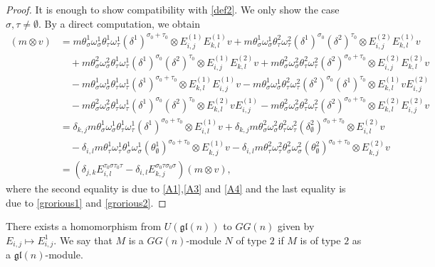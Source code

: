 \documentclass{article}
\theoremstyle{definition}
\theoremstyle{remark}
\numberwithin{equation}{section}
\numberwithin{equation}{section}
\begin{document}
\begin{proof}
It is enough to show compatibility with \eqref{def2}. We only show the case $\sigma,\tau\neq\emptyset$. By a direct computation, we obtain
\begin{align*}
[E_{i,j}^\tau,E_{k,l}^\sigma](m\otimes v)
&=m\theta^1_\sigma\omega^1_\sigma\theta^1_\tau\omega^1_\tau(\delta^1)^{\sigma_0+\tau_0}\otimes E^{(1)}_{i,j}E^{(1)}_{k,l}v+m\theta^1_\sigma\omega^1_\sigma\theta^2_\tau\omega^2_\tau(\delta^1)^{\sigma_0}(\delta^2)^{\tau_0}\otimes E^{(2)}_{i,j}E^{(1)}_{k,l}v\\
&\quad+m\theta^2_\sigma\omega^2_\sigma\theta^1_\tau\omega^1_\tau(\delta^1)^{\sigma_0}(\delta^2)^{\tau_0}\otimes E^{(1)}_{i,j}E^{(2)}_{k,l}v+m\theta^2_\sigma\omega^2_\sigma\theta^2_\tau\omega^2_\tau(\delta^2)^{\sigma_0+\tau_0}\otimes E^{(2)}_{i,j}E^{(2)}_{k,l}v\\
&\quad-m\theta^1_\sigma\omega^1_\sigma\theta^1_\tau\omega^1_\tau(\delta^1)^{\sigma_0+\tau_0}\otimes E^{(1)}_{k,l}E^{(1)}_{i,j}v-m\theta^1_\sigma\omega^1_\sigma\theta^2_\tau\omega^2_\tau(\delta^2)^{\sigma_0}(\delta^1)^{\tau_0}\otimes E^{(1)}_{k,l}vE^{(2)}_{i,j}\\
&\quad-m\theta^2_\sigma\omega^2_\sigma\theta^1_\tau\omega^1_\tau(\delta^1)^{\sigma_0}(\delta^2)^{\tau_0}\otimes E^{(2)}_{k,l}vE^{(1)}_{i,j}-m\theta^2_\sigma\omega^2_\sigma\theta^2_\tau\omega^2_\tau(\delta^2)^{\sigma_0+\tau_0}\otimes E^{(2)}_{k,l}E^{(2)}_{i,j}v\\
&=\delta_{k,j}m\theta^1_\sigma\omega^1_\sigma\theta^1_\tau\omega^1_\tau(\delta^1)^{\sigma_0+\tau_0}\otimes E^{(1)}_{i,l}v+\delta_{k,j}m\theta^2_\sigma\omega^2_\sigma\theta^2_\tau\omega^2_\tau(\delta^2_\emptyset)^{\sigma_0+\tau_0}\otimes E^{(2)}_{i,l}v\\
&\quad-\delta_{i,l}m\theta^1_\tau\omega^1_\tau\theta^1_\sigma\omega^1_\sigma(\theta^1_\emptyset)^{\sigma_0+\tau_0}\otimes E^{(1)}_{k,j}v-\delta_{i,l}m\theta^2_\tau\omega^2_\tau\theta^2_\sigma\omega^2_\sigma(\theta^2_\emptyset)^{\sigma_0+\tau_0}\otimes E^{(2)}_{k,j}v\\
&=(\delta_{j,k}E_{i,l}^{\tau_0\sigma\tau_0\tau}-\delta_{i,l}E_{k,j}^{\sigma_0\tau\sigma_0\sigma})(m\otimes v),
\end{align*}
where the second equality is due to \eqref{A1},\eqref{A3} and \eqref{A4} and the last equality is due to \eqref{grorious1} and \eqref{grorious2}.
\end{proof}
There exists a homomorphism from $U(\mathfrak{gl}(n))$ to $GG(n)$ given by $E_{i,j}\mapsto E^1_{i,j}$. We say that $M$ is a $GG(n)$-module $N$ of type $2$ if $M$ is of type $2$ as a $\mathfrak{gl}(n)$-module.
\end{document}
